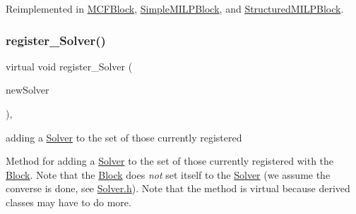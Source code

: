 Reimplemented in \mbox{\hyperlink{class_s_m_spp__di__unipi__it_1_1_m_c_f_block_a617885c1d228e0ca67bbb0efdbe713e3}{M\+C\+F\+Block}}, \mbox{\hyperlink{class_s_m_spp__di__unipi__it_1_1_simple_m_i_l_p_block_a59a9fcbf8f9f86d348344b2073644b0e}{Simple\+M\+I\+L\+P\+Block}}, and \mbox{\hyperlink{class_s_m_spp__di__unipi__it_1_1_structured_m_i_l_p_block_a59a9fcbf8f9f86d348344b2073644b0e}{Structured\+M\+I\+L\+P\+Block}}.

\mbox{\label{class_s_m_spp__di__unipi__it_1_1_block_a4bf9d1856367faf430d0143a6ee55655}} 
\subsubsection{\texorpdfstring{register\+\_\+\+Solver()}{register\_Solver()}}
{\footnotesize\ttfamily virtual void register\+\_\+\+Solver (\begin{DoxyParamCaption}\item[{\mbox{\hyperlink{class_s_m_spp__di__unipi__it_1_1_solver}{Solver}} $\ast$}]{new\+Solver }\end{DoxyParamCaption})\hspace{0.3cm}{\ttfamily [inline]}, {\ttfamily [virtual]}}



adding a \mbox{\hyperlink{class_s_m_spp__di__unipi__it_1_1_solver}{Solver}} to the set of those currently registered 

Method for adding a \mbox{\hyperlink{class_s_m_spp__di__unipi__it_1_1_solver}{Solver}} to the set of those currently registered with the \mbox{\hyperlink{class_s_m_spp__di__unipi__it_1_1_block}{Block}}. Note that the \mbox{\hyperlink{class_s_m_spp__di__unipi__it_1_1_block}{Block}} does {\itshape not} set itself to the \mbox{\hyperlink{class_s_m_spp__di__unipi__it_1_1_solver}{Solver}} (we assume the converse is done, see \mbox{\hyperlink{_solver_8h}{Solver.\+h}}). Note that the method is virtual because derived classes may have to do more. \mbox{\label{class_s_m_spp__di__unipi__it_1_1_block_a10f535001a82e7e9950f3a69967ae56e}} 
